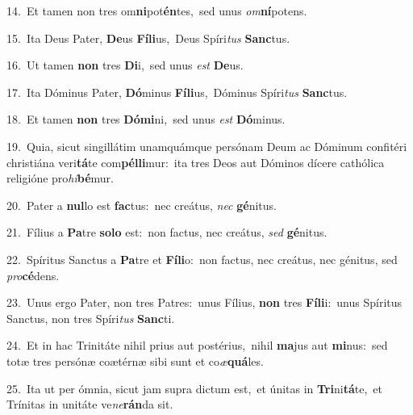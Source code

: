 {\numbfont\textcolor{\numbcolor}{14.}}~Et tamen non tres om\-\textbf{ni}\-pot\-\textbf{én}\-tes,~\star sed unus \textit{om}\-\textbf{ní}potens.\par
{\numbfont\textcolor{\numbcolor}{15.}}~Ita Deus Pater, \textbf{De}\-us \textbf{Fí}\-\textbf{li}us,~\star Deus Spíri\textit{tus} \textbf{Sanc}\-tus.\par
{\numbfont\textcolor{\numbcolor}{16.}}~Ut tamen \textbf{non} tres \textbf{Di}\-i,~\star sed unus \textit{est} \textbf{De}\-us.\par
{\numbfont\textcolor{\numbcolor}{17.}}~Ita Dóminus Pater, \textbf{Dó}\-minus \textbf{Fí}\-\textbf{li}us,~\star Dóminus Spíri\textit{tus} \textbf{Sanc}\-tus.\par
{\numbfont\textcolor{\numbcolor}{18.}}~Et tamen \textbf{non} tres \textbf{Dó}\-\textbf{mi}ni,~\star sed unus \textit{est} \textbf{Dó}\-minus.\par
{\numbfont\textcolor{\numbcolor}{19.}}~Quia, sicut singillátim unamquámque persónam Deum ac Dóminum confitéri christiána veri\-\textbf{tá}\-te com\-\textbf{pél}\-\textbf{li}mur:~\star ita tres Deos aut Dóminos dícere cathólica religióne pro\-\textit{hi}\-\textbf{bé}mur.\par
{\numbfont\textcolor{\numbcolor}{20.}}~Pater a \textbf{nul}\-lo est \textbf{fac}\-tus:~\star nec creátus, \textit{nec} \textbf{gé}\-nitus.\par
{\numbfont\textcolor{\numbcolor}{21.}}~Fílius a \textbf{Pa}\-tre \textbf{so}\-\textbf{lo} est:~\star non factus, nec creátus, \textit{sed} \textbf{gé}\-nitus.\par
{\numbfont\textcolor{\numbcolor}{22.}}~Spíritus Sanctus a \textbf{Pa}\-tre et \textbf{Fí}\-\textbf{li}o:~\star non factus, nec creátus, nec génitus, sed \textit{pro}\-\textbf{cé}dens.\par
{\numbfont\textcolor{\numbcolor}{23.}}~Unus ergo Pater, non tres Patres:~\dagger unus Fílius, \textbf{non} tres \textbf{Fí}\-\textbf{li}i:~\star unus Spíritus Sanctus, non tres Spíri\textit{tus} \textbf{Sanc}\-ti.\par
{\numbfont\textcolor{\numbcolor}{24.}}~Et in hac Trinitáte nihil prius aut postérius,~\dagger nihil \textbf{ma}\-jus aut \textbf{mi}\-nus:~\star sed totæ tres persónæ coætérnæ sibi sunt et co\-\textit{æ}\-\textbf{quá}les.\par
{\numbfont\textcolor{\numbcolor}{25.}}~Ita ut per ómnia, sicut jam supra dictum est,~\dagger et únitas in \textbf{Tri}\-ni\-\textbf{tá}\-te,~\star et Trínitas in unitáte ve\-\textit{ne}\-\textbf{rán}da sit.\par
